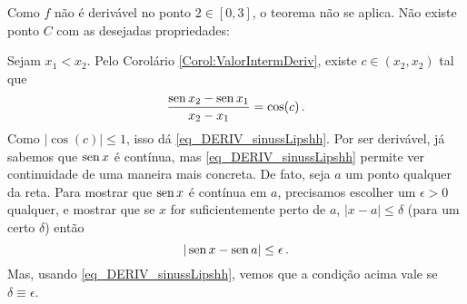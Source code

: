 \begin{Solution}{6.30}
Como $f$ não é derivável no ponto $2\in [0,3]$, o teorema não se aplica. Não
existe ponto $C$ com as desejadas propriedades:
\begin{center}
\begin{bmlimage}\end{bmlimage}
\end{center}

\end{Solution}
\begin{Solution}{6.31}
Sejam $x_1<x_2$. Pelo Corolário \ref{Corol:ValorIntermDeriv}, existe $c\in
(x_2,x_2)$ tal que
\[
\frac{\operatorname{sen} x_2-\operatorname{sen} x_1}{x_2-x_1}=\cos(c)\,.
\]
Como $|\cos (c)|\leq 1$, isso dá \eqref{eq_DERIV_sinussLipshh}.
Por ser derivável, já sabemos que $\operatorname{sen} x$ é contínua, mas \eqref{eq_DERIV_sinussLipshh}
permite ver continuidade de uma maneira mais concreta. De fato,
seja $a$ um ponto qualquer da reta. Para mostrar que $\operatorname{sen} x$ é contínua em
$a$, precisamos escolher um $\epsilon>0$ qualquer, e mostrar que se $x$ for
suficientemente perto de $a$, $|x-a|\leq \delta$ (para um certo $\delta$) então
\[
|\operatorname{sen} x-\operatorname{sen} a|\leq \epsilon\,.
\]
Mas, usando \eqref{eq_DERIV_sinussLipshh}, vemos que a condição acima
vale se $\delta\equiv \epsilon$.
\end{Solution}
